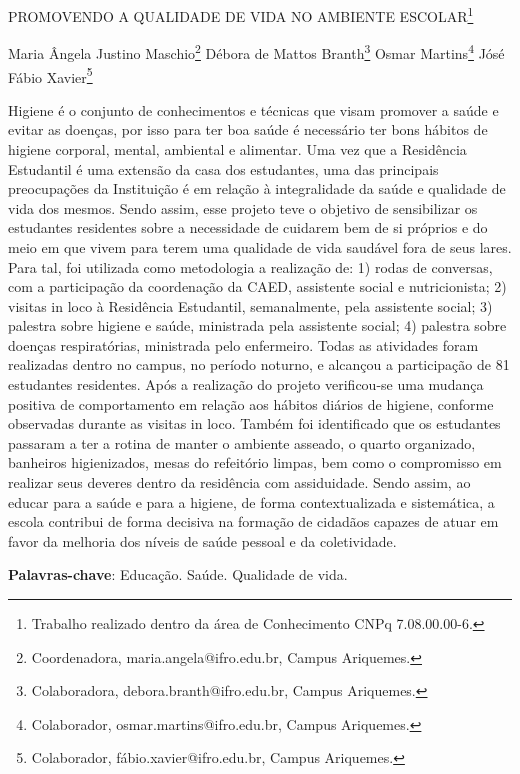 \documentclass[article,12pt,onesidea,4paper,english,brazil]{abntex2}
\begin{document}
	
	
	\frenchspacing 
	
	\begin{center}
		\LARGE PROMOVENDO A QUALIDADE DE VIDA NO AMBIENTE
		ESCOLAR\footnote{Trabalho realizado dentro da área de Conhecimento CNPq 7.08.00.00-6.}
		
		\normalsize
		Maria Ângela Justino Maschio\footnote{Coordenadora, maria.angela@ifro.edu.br, Campus Ariquemes.} 
		Débora de Mattos Branth\footnote{Colaboradora, debora.branth@ifro.edu.br, Campus Ariquemes.} 
		Osmar Martins\footnote{Colaborador, osmar.martins@ifro.edu.br, Campus Ariquemes.} 
	Jósé Fábio Xavier\footnote{Colaborador, fábio.xavier@ifro.edu.br, Campus Ariquemes.} 
	\end{center}
	
	\noindent Higiene é o conjunto de conhecimentos e técnicas que visam promover a saúde e
	evitar as doenças, por isso para ter boa saúde é necessário ter bons hábitos de
	higiene corporal, mental, ambiental e alimentar. Uma vez que a Residência
	Estudantil é uma extensão da casa dos estudantes, uma das principais
	preocupações da Instituição é em relação à integralidade da saúde e qualidade de
	vida dos mesmos. Sendo assim, esse projeto teve o objetivo de sensibilizar os
	estudantes residentes sobre a necessidade de cuidarem bem de si próprios e do
	meio em que vivem para terem uma qualidade de vida saudável fora de seus lares.
	Para tal, foi utilizada como metodologia a realização de: 1) rodas de conversas, com
	a participação da coordenação da CAED, assistente social e nutricionista; 2) visitas
	in loco à Residência Estudantil, semanalmente, pela assistente social; 3) palestra
	sobre higiene e saúde, ministrada pela assistente social; 4) palestra sobre doenças
	respiratórias, ministrada pelo enfermeiro. Todas as atividades foram realizadas
	dentro no campus, no período noturno, e alcançou a participação de 81 estudantes
	residentes. Após a realização do projeto verificou-se uma mudança positiva de
	comportamento em relação aos hábitos diários de higiene, conforme observadas
	durante as visitas in loco. Também foi identificado que os estudantes passaram a ter
	a rotina de manter o ambiente asseado, o quarto organizado, banheiros
	higienizados, mesas do refeitório limpas, bem como o compromisso em realizar seus
	deveres dentro da residência com assiduidade. Sendo assim, ao educar para a
	saúde e para a higiene, de forma contextualizada e sistemática, a escola contribui de
	forma decisiva na formação de cidadãos capazes de atuar em favor da melhoria dos
	níveis de saúde pessoal e da coletividade.
	
	\vspace{\onelineskip}
	
	\noindent
	\textbf{Palavras-chave}: Educação. Saúde. Qualidade de vida.
	
\end{document}
